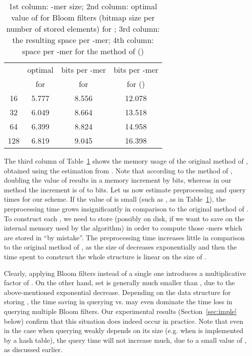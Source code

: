 \documentclass[pdftex]{llncs}\usepackage[T1]{fontenc}
\begin{document}
\begin{table}
\begin{center}
\begin{tabular}{|c|c|c|c|}
\hline
 &optimal  & bits per -mer & bits per -mer\\
 & for  & for  & for  (\cite{DBLP:conf/wabi/ChikhiR12}) \\\hline\hline
16 & 5.777 & 8.556& 12.078 \\
\hline
32 & 6.049 & 8.664& 13.518 \\
\hline
64 & 6.399 & 8.824& 14.958 \\
\hline
128 & 6.819 & 9.045& 16.398\\
\hline
\end{tabular}
\end{center}
\caption{1st column: -mer size; 2nd column: optimal value of  for Bloom filters (bitmap size per number of stored elements) for ; 3rd column: the resulting space per -mer; 4th column: space per -mer for the method of \cite{DBLP:conf/wabi/ChikhiR12} ()
}\label{table1}
\end{table}

The third column of Table~\ref{table1} shows the memory usage of the original method of \cite{DBLP:conf/wabi/ChikhiR12}, obtained using the estimation 
 from \cite{DBLP:conf/wabi/ChikhiR12}. 
Note that according to the method of \cite{DBLP:conf/wabi/ChikhiR12},
doubling the value of  results in a memory increment by 
bits, whereas in our method the increment is of  to 
bits. 
\bigskip
Let us now estimate preprocessing and query times for our scheme. If the value of  is small (such as , as in  Table~\ref{table1}), the preprocessing time grows insignificantly in comparison to the original method of \cite{DBLP:conf/wabi/ChikhiR12}. To construct each , we need to store  (possibly on disk, if we want to save on the internal memory used by the algorithm) in order to compute those -mers which are stored in  ``by mistake''.
The preprocessing time increases little in comparison to the original method of \cite{DBLP:conf/wabi/ChikhiR12}, as the size of  decreases exponentially and then the time spent to construct the whole structure is linear on the size of .


Clearly, applying  Bloom filters instead of a single one introduces
a multiplicative factor of . On the other hand, set 
is generally much smaller than , due to the above-mentioned
exponential decrease. Depending on the data structure for storing
, the time saving in querying  vs.  may even dominate
the time loss in querying multiple Bloom filters. Our experimental
results (Section~\ref{sec:imple} below) confirm that this situation
does indeed occur in practice. Note that even in the case when
querying  weakly depends on its size (e.g. when  is
implemented by a hash table), the query time will not increase much,
due to a small value of , as discussed earlier. 
\end{document}
